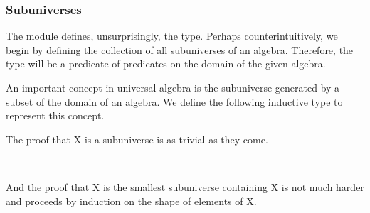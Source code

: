 \documentclass[a4paper,UKenglish,cleveref,autoref,thm-restate]{lipics-v2021}
\begin{document}
\subsubsection{Subuniverses}
The \ualibSubuniverses module defines, unsurprisingly, the  type. Perhaps counterintuitively, we begin by defining the collection of all subuniverses of an algebra. Therefore, the type will be a predicate of predicates on the domain of the given algebra.
\ccpad
\begin{code}
  
\end{code}
\ccpad
An important concept in universal algebra is the subuniverse generated by a subset of the domain of an algebra.  We define the following inductive type to represent this concept.
\ccpad
\begin{code}
  
\end{code}
\ccpad
The proof that  \ab X is a subuniverse is as trivial as they come.
\ccpad
\begin{code}
\>[0]\AgdaSpace{}%
\AgdaSymbol{:}\AgdaSpace{}%
\AgdaSymbol{\{}\AgdaSpace{}%
\AgdaSpace{}%
\AgdaSymbol{:}\AgdaSpace{}%
\AgdaSymbol{\}\{}\AgdaSpace{}%
\AgdaSymbol{:}\AgdaSpace{}%
\AgdaSpace{}%
\AgdaSpace{}%
\AgdaSymbol{\}\{}\AgdaSpace{}%
\AgdaSymbol{:}\AgdaSpace{}%
\AgdaSpace{}%
\AgdaSpace{}%
\AgdaSpace{}%
\AgdaSpace{}%
\AgdaSymbol{\}}\AgdaSpace{}%
\AgdaSpace{}%
\AgdaSpace{}%
\AgdaSpace{}%
\AgdaSpace{}%
\AgdaSpace{}%
\AgdaSpace{}%
\<%
\\
\>[0]\AgdaSpace{}%
\AgdaSymbol{=}\AgdaSpace{}%
\<%
\end{code}
\ccpad
And the proof that  \ab X is the smallest subuniverse containing \ab X is not much harder and proceeds by induction on the shape of elements of  \ab X.
\ccpad
\end{document}
